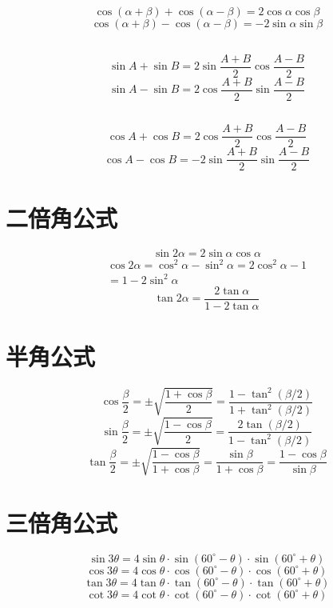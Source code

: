 \documentclass[a4paper, fleqn, fontset = mac]{ctexart}
\newcommand{\degree}{^\circ}
\newcommand{\diform}{\noindent}
\begin{document}
\begin{multicols}{2}
		\subsection{}
		\diform
		\[ \cos(\alpha + \beta) + \cos(\alpha - \beta) = 
		2 \cos\alpha\cos\beta \]
		\[ \cos(\alpha + \beta) - \cos(\alpha - \beta) = 
		-2 \sin\alpha\sin\beta \]
		
		\subsection{}
		\diform
		\[ \sin A + \sin B 
		= 2 \sin \frac{A + B}{2} \cos \frac{A - B}{2} \]
		\[ \sin A - \sin B 
		= 2 \cos \frac{A + B}{2} \sin \frac{A - B}{2} \] 
		
		\subsection{}
		\diform
		\[ \cos A + \cos B 
		= 2 \cos \frac{A + B}{2} \cos \frac{A - B}{2} \]
		\[ \cos A - \cos B 
		=-2 \sin \frac{A + B}{2} \sin \frac{A - B}{2} \] 
		
		\section{二倍角公式}
		\diform
		\[ \sin2\alpha = 2 \sin\alpha \cos\alpha \]
		\begin{align*}
		\cos2\alpha = \cos^2\alpha-\sin^2\alpha
		= 2\cos^2\alpha - 1 \\ = 1 - 2\sin^2\alpha
		\end{align*}
		\[ \tan2\alpha = \frac{2\tan\alpha}{1-2\tan\alpha} \]
	
		\section{半角公式}
		\diform
		\[ \cos\frac\beta2 = \pm \sqrt{\frac{1+\cos\beta}{2}}
	 	= \frac{1-\tan^2\left(\beta/2\right)}{1+\tan^2\left(\beta/2\right)} \]
		\[ \sin\frac\beta2 = \pm \sqrt{\frac{1-\cos\beta}{2}}
		= \frac{2\tan\left(\beta/2\right)}{1-\tan^2\left(\beta/2\right)} \]
		\[ \tan\frac\beta2 = \pm \sqrt{\frac{1-\cos\beta}{1+\cos\beta}}
		= \frac{\sin\beta}{1+\cos\beta}
		= \frac{1-\cos\beta}{\sin\beta}  \]
	
		\section{三倍角公式}
		\diform
		\[ \sin3\theta = 4\sin\theta 
		\cdot \sin\left(60\degree-\theta\right)
		\cdot \sin\left(60\degree+\theta\right) \]
		\[ \cos3\theta = 4\cos\theta 
		\cdot \cos\left(60\degree-\theta\right)
		\cdot \cos\left(60\degree+\theta\right) \]
		\[ \tan3\theta = 4\tan\theta 
		\cdot \tan\left(60\degree-\theta\right)
		\cdot \tan\left(60\degree+\theta\right) \]
		\[ \cot3\theta = 4\cot\theta 
		\cdot \cot\left(60\degree-\theta\right)
		\cdot \cot\left(60\degree+\theta\right) \]
	

\end{multicols}
\end{document}
